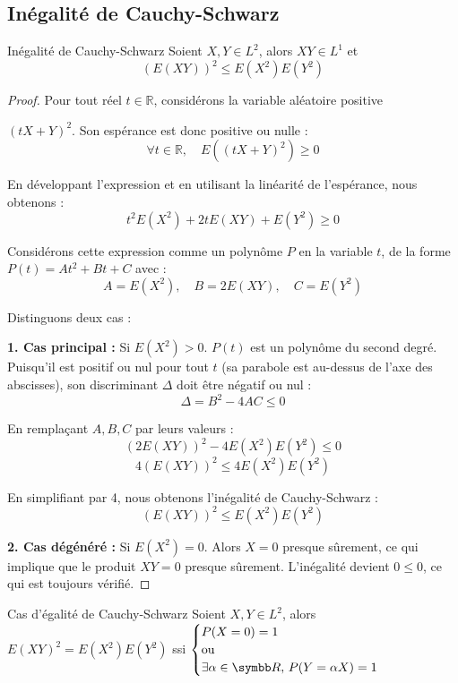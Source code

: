 \subsection{Inégalité de Cauchy-Schwarz }

\begin{theoreme}{Inégalité de Cauchy-Schwarz}{}
    Soient $X, Y \in L^2$, alors $XY \in L^1$ et
    $$ (E(XY))^2 \leqslant E(X^2) E(Y^2) $$
\end{theoreme}

\begin{proof}
    Pour tout réel $t \in \mathbb{R}$, considérons la variable aléatoire positive 
    
    $(tX + Y)^2$.
    Son espérance est donc positive ou nulle :
    $$ \forall t \in \mathbb{R}, \quad E\left( (tX + Y)^2 \right) \geqslant 0 $$
    
    En développant l'expression et en utilisant la linéarité de l'espérance, nous obtenons :
    $$ t^2 E(X^2) + 2t E(XY) + E(Y^2) \geqslant 0 $$
    
    Considérons cette expression comme un polynôme $P$ en la variable $t$, de la forme $P(t) = A t^2 + Bt + C$ avec :
    $$ A = E(X^2), \quad B = 2E(XY), \quad C = E(Y^2) $$
    
    Distinguons deux cas :
    
    \textbf{1. Cas principal :} Si $E(X^2) > 0$.
    $P(t)$ est un polynôme du second degré. Puisqu'il est positif ou nul pour tout $t$ (sa parabole est au-dessus de l'axe des abscisses), son discriminant $\Delta$ doit être négatif ou nul :
    $$ \Delta = B^2 - 4AC \leqslant 0 $$
    
    En remplaçant $A, B, C$ par leurs valeurs :
    $$ (2E(XY))^2 - 4 E(X^2) E(Y^2) \leqslant 0 $$
    $$ 4 (E(XY))^2 \leqslant 4 E(X^2) E(Y^2) $$
    
    En simplifiant par 4, nous obtenons l'inégalité de Cauchy-Schwarz :
    $$ (E(XY))^2 \leqslant E(X^2) E(Y^2) $$
    
    \textbf{2. Cas dégénéré :} Si $E(X^2) = 0$.
    Alors $X = 0$ presque sûrement, ce qui implique que le produit $XY = 0$ presque sûrement. 
    L'inégalité devient $0 \leqslant 0$, ce qui est toujours vérifié.
\end{proof}

\begin{proposition}{Cas d'égalité de Cauchy-Schwarz}{}
    Soient $X, Y \in L^2$, alors $E(XY)^2 = E(X^2) E(Y^2)$ ssi 
    $\begin{cases}
        P(X = 0) = 1 \\
        \text{ou} \\
        \exists \alpha \in \R, \, P(Y = \alpha X) = 1
    \end{cases}$
\end{proposition}

